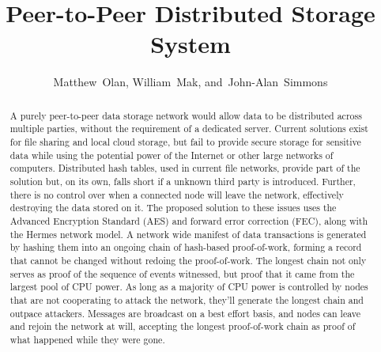 \documentclass[journal]{IEEEtran}
\begin{document}
\title{Peer-to-Peer Distributed Storage System}

\author{
        Matthew~Olan, %
        William~Mak,
        and~John-Alan~Simmons
}


\maketitle

\begin{abstract} %
A purely peer-to-peer data storage network would allow data to be distributed across multiple parties, without the requirement of a dedicated server. Current solutions exist for file sharing and local cloud storage, but fail to provide secure storage for sensitive data while using the potential power of the Internet or other large networks of computers. Distributed hash tables, used in current file networks, provide part of the solution but, on its own, falls short if a unknown third party is introduced. Further, there is no control over when a connected node will leave the network, effectively destroying the data stored on it. The proposed solution to these issues uses the Advanced Encryption Standard (AES) and forward error correction (FEC), along with the Hermes network model. A network wide manifest of data transactions is generated by hashing them into an ongoing chain of hash-based proof-of-work, forming a record that cannot be changed without redoing the proof-of-work. The longest chain not only serves as proof of the sequence of events witnessed, but proof that it came from the largest pool of CPU power. As long as a majority of CPU power is controlled by nodes that are not cooperating to attack the network, they'll generate the longest chain and outpace attackers. Messages are broadcast on a best effort basis, and nodes can leave and rejoin the network at will, accepting the longest proof-of-work chain as proof of what happened while they were gone.
\end{abstract}


\IEEEpeerreviewmaketitle
\end{document}
